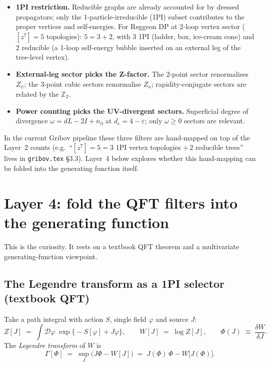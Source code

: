\documentclass[11pt,a4paper]{article}
\begin{document}
\begin{itemize}[leftmargin=2em,itemsep=4pt]
  \item \textbf{1PI restriction.} Reducible graphs are already accounted for by
        dressed propagators; only the 1-particle-irreducible (1PI) subset
        contributes to the proper vertices and self-energies. For Reggeon DP at
        2-loop vertex sector ($[z^7]=5$ topologies): $5 = 3 + 2$, with $3$ 1PI
        (ladder, box, ice-cream cone) and $2$ reducible (a 1-loop self-energy
        bubble inserted on an external leg of the tree-level vertex).
  \item \textbf{External-leg sector picks the Z-factor.} The 2-point sector
        renormalises $Z_\psi$; the 3-point cubic sectors renormalise $Z_u$;
        rapidity-conjugate sectors are related by the $\mathbb Z_2$.
  \item \textbf{Power counting picks the UV-divergent sectors.} Superficial
        degree of divergence $\omega = dL - 2I + n_\partial$ at $d_c = 4{-}\varepsilon$;
        only $\omega\ge 0$ sectors are relevant.
\end{itemize}

In the current Gribov pipeline these three filters are hand-mapped on top of
the Layer~2 counts (e.g.\ ``$[z^7]=5 = 3$ 1PI vertex topologies $+\,2$
reducible trees'' lives in \texttt{gribov.tex} \S 3.3). Layer~4 below explores
whether this hand-mapping can be folded into the generating function itself.

\section{Layer 4: fold the QFT filters into the generating function}

This is the curiosity. It rests on a textbook QFT theorem and a multivariate
generating-function viewpoint.

\subsection{The Legendre transform as a 1PI selector (textbook QFT)}

Take a path integral with action $S$, single field $\varphi$ and source $J$:
\[
Z[J] \;=\; \int\!\mathcal{D}\varphi\;\exp\!\bigl\{-S[\varphi] + J\varphi\bigr\},
\qquad W[J] \;=\; \log Z[J],
\qquad \Phi(J) \;\equiv\; \frac{\delta W}{\delta J}.
\]
The \emph{Legendre transform} of $W$ is
\[
\boxed{\;\Gamma[\Phi] \;=\; \sup_J\bigl(J\Phi - W[J]\bigr) \;=\; J(\Phi)\,\Phi - W\bigl[J(\Phi)\bigr].\;}
\]
\end{document}

